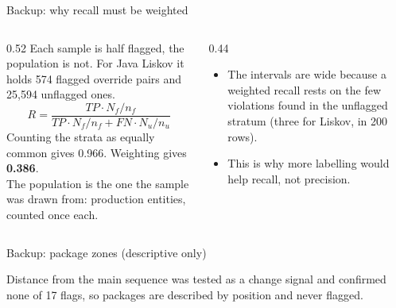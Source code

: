 \documentclass[11pt,aspectratio=169]{beamer}
\newcommand{\thesisfigH}[2]{{\rmfamily\resizebox{!}{#1}{}}}
\begin{document}
\begin{frame}{Backup: why recall must be weighted}
\begin{columns}[T,onlytextwidth]
\begin{column}{0.52\textwidth}
\small
Each sample is half flagged, the population is not. For Java Liskov it holds 574 flagged override
pairs and 25,594 unflagged ones.
\[ R=\frac{TP\cdot N_f/n_f}{TP\cdot N_f/n_f+FN\cdot N_u/n_u} \]
Counting the strata as equally common gives 0.966. Weighting gives \textbf{0.386}.\\[4pt]
{\footnotesize The population is the one the sample was drawn from: production entities, counted
once each.}
\end{column}
\begin{column}{0.44\textwidth}
\begin{itemize}\setlength{\itemsep}{3pt}\small
  \item The intervals are wide because a weighted recall rests on the few violations found in the
        unflagged stratum (three for Liskov, in 200 rows).
  \item This is why more labelling would help recall, not precision.
\end{itemize}
\end{column}
\end{columns}
\end{frame}

\begin{frame}{Backup: package zones (descriptive only)}
\begin{center}
\thesisfigH{0.66\textheight}{fig_martin_plane}
\end{center}
\vspace{-4pt}
{\small Distance from the main sequence was tested as a change signal and confirmed none of 17
flags, so packages are described by position and never flagged.}
\end{frame}
\end{document}
